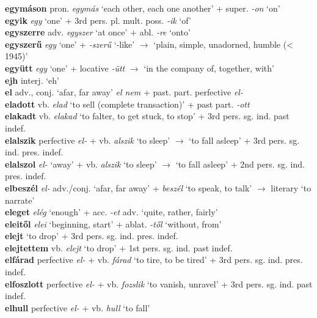 \documentclass[11pt]{article}
\begin{document}
\textbf{egymáson} pron. \emph{egymás} `each other, each one
another' + super. \emph{-on} `on' \\
\textbf{egyik} \emph{egy} `one' + 3rd pers. pl. mult. poss. \emph{-ik}
`of' \\
\textbf{egyszerre} adv. \emph{egyszer} `at once' +
  abl. \emph{-re} `onto' \\
\textbf{egyszerű} \emph{egy} `one' + \emph{-szerű} `-like'
$\rightarrow$ `plain, simple, unadorned, humble (< 1945)' \\
\textbf{együtt} \emph{egy} `one' + locative \emph{-ütt} $\rightarrow$
`in the company of, together, with' \\
\textbf{ejh} interj. `eh' \\
\textbf{el} adv., conj. `afar, far away' \textbar\textbar{} \emph{el
nem} + past. part. \textbar\textbar{} perfective \emph{el-}\\
\textbf{eladott} vb. \emph{elad} `to sell (complete transaction)' + past part. \emph{-ott} \\
\textbf{elakadt} vb. \emph{elakad} `to falter, to get stuck, to stop'
+ 3rd pers. sg. ind. past indef. \\
\textbf{elalszik} perfective \emph{el-} + vb. \emph{alszik}
`to sleep' $\rightarrow$ `to fall asleep' + 3rd
pers. sg. ind. pres. indef. \\
\textbf{elalszol} \emph{el-} `away' + vb. \emph{alszik} `to
sleep' $\rightarrow$ `to fall asleep' + 2nd
pers. sg. ind. pres. indef. \\
\textbf{elbeszél} \emph{el-} adv./conj. `afar, far away'
+ \emph{beszél} `to speak, to talk' $\rightarrow$ literary `to narrate' \\
\textbf{eleget} \emph{elég} `enough' +
acc. \emph{-et} \textbar\textbar{} adv. `quite, rather, fairly' \\
\textbf{eleitől} \emph{elei} `beginning, start' + ablat. \emph{-től} `without,
from' \\
\textbf{elejt} `to drop' + 3rd pers. sg. ind. pres. indef. \\
\textbf{elejtettem} vb. \emph{elejt} `to drop' + 1st
pers. sg. ind. past indef. \\
\textbf{elfárad} perfective \emph{el-} + vb. \emph{fárad} `to
tire, to be tired' + 3rd pers. sg. ind. pres. indef. \\
\textbf{elfoszlott} perfective \emph{el-} + vb. \emph{fozslik}
`to vanish, unravel' + 3rd pers. sg. ind. past indef. \\
\textbf{elhull} perfective \emph{el-} + vb. \emph{hull} `to fall' \\
\end{document}
